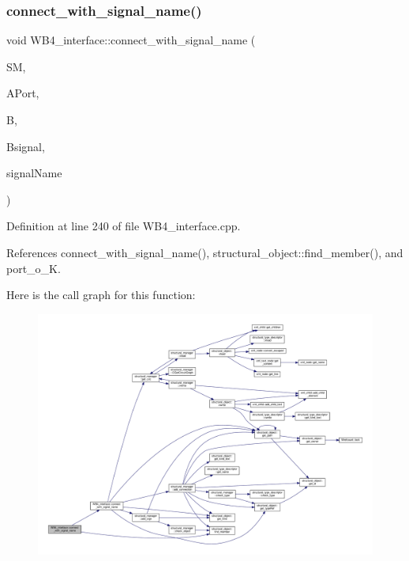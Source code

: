 \subsubsection{\texorpdfstring{connect\+\_\+with\+\_\+signal\+\_\+name()}{connect\_with\_signal\_name()}\hspace{0.1cm}{\footnotesize\ttfamily [2/3]}}
{\footnotesize\ttfamily void W\+B4\+\_\+interface\+::connect\+\_\+with\+\_\+signal\+\_\+name (\begin{DoxyParamCaption}\item[{\hyperlink{structural__manager_8hpp_ab3136f0e785d8535f8d252a7b53db5b5}{structural\+\_\+manager\+Ref}}]{SM,  }\item[{\hyperlink{structural__objects_8hpp_a8ea5f8cc50ab8f4c31e2751074ff60b2}{structural\+\_\+object\+Ref}}]{A\+Port,  }\item[{\hyperlink{structural__objects_8hpp_a8ea5f8cc50ab8f4c31e2751074ff60b2}{structural\+\_\+object\+Ref}}]{B,  }\item[{std\+::string}]{Bsignal,  }\item[{const std\+::string \&}]{signal\+Name }\end{DoxyParamCaption})\hspace{0.3cm}{\ttfamily [protected]}}



Definition at line 240 of file W\+B4\+\_\+interface.\+cpp.



References connect\+\_\+with\+\_\+signal\+\_\+name(), structural\+\_\+object\+::find\+\_\+member(), and port\+\_\+o\+\_\+K.

Here is the call graph for this function\+:
\nopagebreak
\begin{figure}[H]
\begin{center}
\leavevmode
\includegraphics[width=350pt]{d5/d7a/classWB4__interface_ac11ca29f65cd4637605343b6e7eb4126_cgraph}
\end{center}
\end{figure}
\mbox{\label{classWB4__interface_a114e79d54311ed8d17711f293fbc73c9}} 
